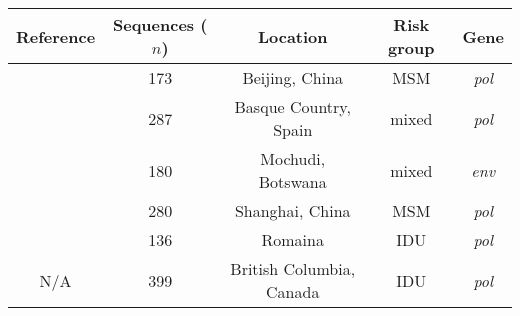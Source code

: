 \begin{tabular}{ccccc}
  Reference & Sequences ($n$) & Location & Risk group & Gene \\
  \hline
  \autocite{wang2015targeting} & 173 & Beijing, China & MSM & \textit{pol} \\
  \autocite{cuevas2009hiv} & 287 & Basque Country, Spain & mixed & \textit{pol} \\
  \autocite{novitsky2013phylogenetic} & \multirow{2}{*}{180} &
  \multirow{2}{*}{Mochudi, Botswana} & \multirow{2}{*}{mixed} &
  \multirow{2}{*}{\textit{env}} \\ \autocite{novitsky2014impact} \\
  \autocite{li2015hiv} & 280 & Shanghai, China & MSM & \textit{pol} \\
  \autocite{niculescu2015recent} & 136 & Romaina & IDU & \textit{pol} \\
  N/A & 399 & British Columbia, Canada & IDU & \textit{pol} \\
  \hline
\end{tabular}
